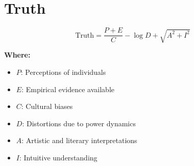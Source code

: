 \chapter{Truth}

\begin{equation}
\text{Truth} = \frac{P + E}{C} - \log{D} + \sqrt{A^2 + I^2}
\end{equation}

\textbf{Where:}

\begin{itemize}
    \item $P$: Perceptions of individuals
    \item $E$: Empirical evidence available
    \item $C$: Cultural biases
    \item $D$: Distortions due to power dynamics
    \item $A$: Artistic and literary interpretations
    \item $I$: Intuitive understanding
\end{itemize}